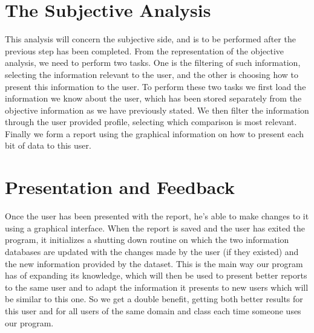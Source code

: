 \section{The Subjective Analysis}
\label{cap2:sec:subjective}

This analysis will concern the subjective side, and is to be performed after the previous step has been completed.
From the representation of the objective analysis, we need to perform two tasks.
One is the filtering of such information, selecting the information relevant to the user, and the other is choosing how to present this information to the user.
To perform these two tasks we first load the information we know about the user, which has been stored separately from the objective information as we have previously stated.
We then filter the information through the user provided profile, selecting which comparison is most relevant. Finally we form a report using the graphical information on how to present each bit of data to this user.

\section{Presentation and Feedback}
\label{cap2:sec:feedback}

Once the user has been presented with the report, he's able to make changes to it using a graphical interface. When the report is saved and the user has exited the program, it initializes a shutting down routine on which the two information databases are updated with the changes made by the user (if they existed) and the new information provided by the dataset.
This is the main way our program has of expanding its knowledge, which will then be used to present better reports to the same user and to adapt the information it presents to new users which will be similar to this one.
So we get a double benefit, getting both better results for this user and for all users of the same domain and class each time someone uses our program.



\section*{\NotasBibliograficas}
\TocNotasBibliograficas

